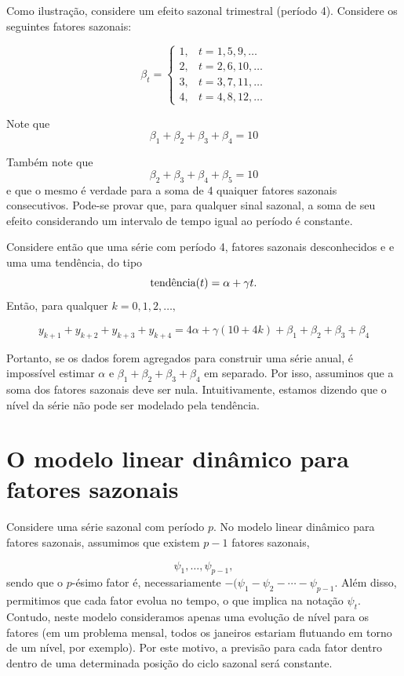 \documentclass[
  letterpaper,
  DIV=11,
  numbers=noendperiod]{scrreprt}
\begin{document}
Como ilustração, considere um efeito sazonal trimestral (período 4).
Considere os seguintes fatores sazonais:

\[\beta_t=\left\{\begin{array}{ll}1,& t=1,5,9,\ldots \\
2,& t=2,6,10,\ldots\\
3,&t=3,7,11,\ldots \\
4,&t=4,8,12,\ldots\end{array}\right.\]

Note que \[\beta_1+\beta_2+\beta_3+\beta_4=10\]

Também note que \[\beta_2+\beta_3+\beta_4+\beta_5=10\] e que o mesmo é
verdade para a soma de 4 quaiquer fatores sazonais consecutivos. Pode-se
provar que, para qualquer sinal sazonal, a soma de seu efeito
considerando um intervalo de tempo igual ao período é constante.

Considere então que uma série com período 4, fatores sazonais
desconhecidos e e uma uma tendência, do tipo
\[\hbox{tendência}(t)=\alpha+\gamma t.\] Então, para qualquer
\(k=0,1,2,\ldots,\)

\[y_{k+1}+y_{k+2}+y_{k+3}+y_{k+4}=4\alpha+\gamma(10+4k)+\beta_1+\beta_2+\beta_3+\beta_4\]

Portanto, se os dados forem agregados para construir uma série anual, é
impossível estimar \(\alpha\) e \(\beta_1+\beta_2+\beta_3+\beta_4\) em
separado. Por isso, assuminos que a soma dos fatores sazonais deve ser
nula. Intuitivamente, estamos dizendo que o nível da série não pode ser
modelado pela tendência.

\hypertarget{o-modelo-linear-dinuxe2mico-para-fatores-sazonais}{%
\section{O modelo linear dinâmico para fatores
sazonais}\label{o-modelo-linear-dinuxe2mico-para-fatores-sazonais}}

Considere uma série sazonal com período \(p\). No modelo linear dinâmico
para fatores sazonais, assumimos que existem \(p-1\) fatores sazonais,

\[\psi_1,\ldots,\psi_{p-1},\] sendo que o \(p\)-ésimo fator é,
necessariamente \(-(\psi_1-\psi_2-\cdots-\psi_{p-1}\). Além disso,
permitimos que cada fator evolua no tempo, o que implica na notação
\(\psi_t\). Contudo, neste modelo consideramos apenas uma evolução de
nível para os fatores (em um problema mensal, todos os janeiros estariam
flutuando em torno de um nível, por exemplo). Por este motivo, a
previsão para cada fator dentro dentro de uma determinada posição do
ciclo sazonal será constante.
\end{document}
